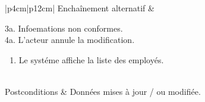 \begin{longtable}{|p{4cm}|p{12cm}|}
                    \hline
                    Enchaînement alternatif &  
                    \begin{minipage}[t]{\linewidth}
                    	3a. Infoemations non conformes.\\
                        4a. L'acteur annule la modification.
                        \begin{enumerate}[nosep,after=\strut]
                              \item Le systéme affiche la liste des employés.
                        \end{enumerate}
                    \end{minipage}
                    \\
                    
                    \hline
                    Postconditions &  Données mises à jour / ou modifiée. \\
                    \hline
                    \caption{Description du cas d'utilisation « Modifier employé »}\\
            \end{longtable}
 
